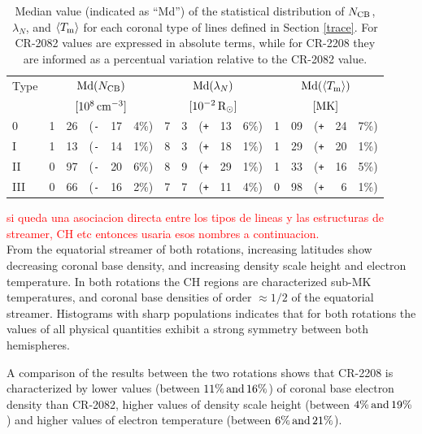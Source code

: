 \documentclass[namedreferences]{solarphysics}
\newcommand{\mrsun}{{\rm R_\odot}}
\newcommand{\med}{{\rm Md}}
\newcommand{\avgTe}{\left<\Tm\right>}
\newcommand{\MK}{{\rm MK}}
\newcommand{\lN}{\lambda_N}
\newcommand{\NCB}{N_{\rm CB}}
\newcommand{\Tm}{T_{\rm m}}
\newcommand{\aTm}{\left<\Tm\right>}
\newcommand{\Pl}{\texttt{+}}
\newcommand{\Mi}{\texttt{-}}
\def\diego#1{\textcolor{red}{#1}}
\begin{document}
\begin{article}
\begin{table}
\begin{tabular}{l r@{.}l@{\hskip 0.05in} r@{\hskip 0.01in} r@{.}l  r@{.}l@{\hskip 0.05in} r@{\hskip 0.01in} r@{.}l r@{.}l@{\hskip 0.05in} r@{\hskip 0.01in} r@{.}l }
\hline
Type    & \multicolumn{5}{c}{$\med(\NCB)$}             & \multicolumn{5}{c}{$\med(\lN)$} & \multicolumn{5}{c}{$\med(\avgTe)$} \\
       & \multicolumn{5}{c}{$[10^8\,{\rm cm}^{-3}]$}  & \multicolumn{5}{c}{$[{\rm 10}^{-2}\,\mrsun]$} & \multicolumn{5}{c}{$[\MK]$} \\
\hline
0    & 1&26 &(\Mi&17&4\%)  &   7&3 &(\Pl&13&6\%) &   1&09 &(\Pl&24&7\%) \\
I    & 1&13 &(\Mi&14&1\%)  &   8&3 &(\Pl&18&1\%) &   1&29 &(\Pl&20&1\%) \\
II   & 0&97 &(\Mi&20&6\%)  &   8&9 &(\Pl&29&1\%) &   1&33 &(\Pl&16&5\%) \\
III  & 0&66 &(\Mi&16&2\%)  &   7&7 &(\Pl&11&4\%) &   0&98 &(\Pl&~6&1\%) \\
\hline          
\end{tabular}
\caption{Median value (indicated as ``Md'') of the statistical distribution of $\NCB$, $\lN$, and $\aTm$ for each coronal type of lines defined in Section \ref{trace}. For CR-2082 values are expressed in absolute terms, while for CR-2208 they are informed as a percentual variation relative to the CR-2082 value.}
\label{tabla_demt}
\end{table}

\diego{si queda una asociacion directa entre los tipos de lineas y las estructuras de streamer, CH etc entonces usaria esos nombres a continuacion.}\\
From the equatorial streamer of both rotations, increasing latitudes show decreasing {coronal base} density, and increasing density scale height and electron temperature. In both rotations the CH regions are characterized sub-MK temperatures, and coronal base densities of order $\approx 1/2$ of the equatorial streamer. Histograms with sharp populations indicates that for both rotations the values of all physical quantities exhibit a strong symmetry between both hemispheres. 


A comparison of the results between the two rotations shows that CR-2208 is characterized by lower values (between $11\%\, \rm and\, 16\%$) of coronal base electron density than CR-2082, higher values of density scale height (between $4\%\, \rm and\,19\%$) and higher values of electron temperature (between $6\%\, \rm and\,21\%$).


\end{article}
\end{document}
